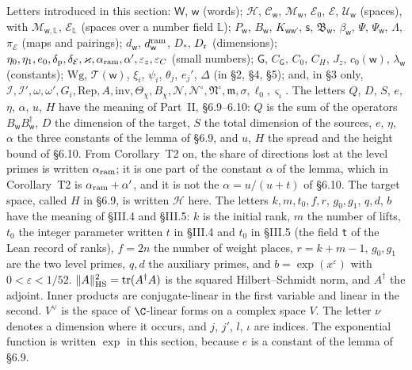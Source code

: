 \documentclass[11pt,letterpaper]{article}
\begin{document}
{\sloppy Letters introduced in this section: $\mathsf W$, $\mathsf w$ (words); $\mathcal H$, $\mathcal C_{\mathsf w}$,
$\mathcal M_{\mathsf w}$, $\mathcal E_0$, $\mathcal E$, $\mathcal U_{\mathsf w}$ (spaces), with $\mathcal M_{\mathsf w,\mathbb L}$,
$\mathcal E_{\mathbb L}$ (spaces over a number field $\mathbb L$); $P_{\mathsf w}$, $B_{\mathsf w}$,
$K_{\mathsf w\mathsf w'}$, $\mathsf s$, $\mathfrak B_{\mathsf w}$, $\beta_{\mathsf w}$, $\Psi$, $\Psi_{\mathsf w}$, $\Lambda$, $\pi_{\mathcal E}$
(maps and pairings); $d_{\mathsf w}$, $d^{\rm ram}_{\mathsf w}$, $D_*$, $D_{\rm r}$ (dimensions);
$\eta_0,\eta_1,e_0,\delta_{\rm p},\delta_{\mathcal E},\varkappa,\alpha_{\rm ram},\alpha',\varepsilon_z,\varepsilon_C$ (small
numbers); $\mathsf G$, $C_{\mathsf G}$, $C_0$, $C_H$, $J_z$, $c_0(\mathsf w)$, $\lambda_{\mathsf w}$ (constants);
$\mathrm{Wg}$, $\mathcal T(\mathsf w)$, $\xi_i$, $\psi_i$, $\theta_j$, $e_j'$, $\Delta$ (in \S2, \S4, \S5); and, in \S3 only,
$\mathcal I,\mathcal I',\omega,\omega',G_i,\mathrm{Rep},A,\mathrm{inv},\Theta_\chi,B_\chi,\mathcal N,\mathcal N^\circ,\mathfrak N^\circ,\mathfrak m,\sigma,\ell_0,\varsigma_\iota$.
The letters $Q$, $D$, $S$, $e$, $\eta$, $\alpha$, $u$, $H$ have the meaning of Part~II, \S6.9--6.10: $Q$ is the sum of
the operators $B_{\mathsf w}B_{\mathsf w}^\dagger$, $D$ the dimension of the target, $S$ the total dimension of the
sources, $e$, $\eta$, $\alpha$ the three constants of the lemma of \S6.9, and $u$, $H$ the spread and the height
bound of \S6.10. From Corollary~T2 on, the share of directions lost at the level primes is written $\alpha_{\rm ram}$; it is one part of the constant $\alpha$ of the lemma, which in Corollary~T2 is $\alpha_{\rm ram}+\alpha'$, and it is not the $\alpha=u/(u+t)$ of \S6.10. The target space, called $H$ in \S6.9, is written $\mathcal H$ here. The letters $k,m,t_0,f,r$,
$g_0,g_1$, $q,d$, $b$ have the meaning of \S III.4 and \S III.5: $k$ is the initial rank, $m$ the number of lifts,
$t_0$ the integer parameter written $t$ in \S III.4 and $t_0$ in \S III.5 (the field \texttt{t} of the Lean record of ranks), $f=2n$ the number of weight places, $r=k+m-1$, $g_0,g_1$ are the two level primes, $q,d$ the auxiliary primes, and
$b=\exp(x^\varepsilon)$ with $0<\varepsilon<1/52$. $\|A\|_{\rm HS}^2=\operatorname{tr}(A^\dagger A)$ is the
squared Hilbert--Schmidt norm, and $A^\dagger$ the adjoint. Inner products are conjugate-linear in the
first variable and linear in the second. $V^\vee$ is the space of $\C$-linear forms on a complex space $V$.
The letter $\nu$ denotes a dimension where it
occurs, and $j$, $j'$, $l$, $\iota$ are indices. The exponential function is written $\exp$ in this section,
because $e$ is a constant of the lemma of \S6.9.\par}
\end{document}
